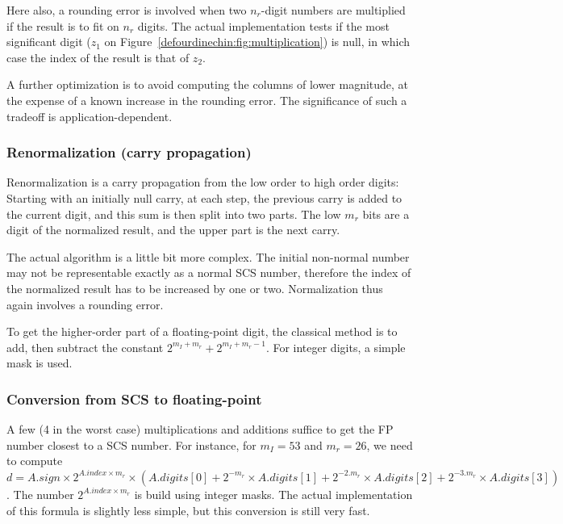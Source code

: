 Here also, a rounding error is involved when two $n_r$-digit numbers
are multiplied if the result is to fit on $n_r$ digits. The actual
implementation tests if the most significant digit ($z_1$ on
Figure~\ref{defourdinechin:fig:multiplication}) is null, in which case the index of
the result is that of $z_2$.

A further optimization is to avoid computing the columns of lower
magnitude, at the expense of a known increase in the rounding error.
The significance of such a tradeoff is application-dependent.


\subsubsection{Renormalization (carry propagation) \label{defourdinechin:renorm}}

Renormalization is a carry propagation from the low
order to high order digits:  Starting with an initially null carry, at
each step, the previous carry is added to the current digit, and this
sum is then split into two parts. The low $m_r$ bits are a digit of
the normalized result, and the upper part is the next carry.

The actual algorithm is a little bit more complex. The initial
non-normal number may not be representable exactly as a normal SCS
number, therefore the index of the normalized result has to be
increased by one or two.  Normalization thus again involves a rounding
error.

To get the higher-order part of a floating-point digit, the classical
method is to add, then subtract the constant
$2^{m_I+m_r}+2^{m_I+m_r-1}$. For integer digits, a simple mask is used.



\subsubsection{Conversion from SCS to floating-point}

A few (4 in the worst case) multiplications and additions suffice to
get the FP number closest to a SCS number.  For instance, for $m_I=53$
and $m_r=26$, we need to compute $d = A.sign \times 2^{A.index \times
  m_r} \times ( A.digits[0]+ 2^{-m_r} \times A.digits[1]+ 2^{-2.m_r}
\times A.digits[2]+ 2^{-3.m_r} \times A.digits[3])$. The number
$2^{A.index \times m_r}$ is build using integer masks. The actual
implementation of this formula is slightly less simple, but this
conversion is still very fast.


